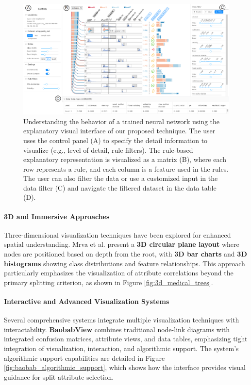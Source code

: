 \begin{figure}[!htb]
    \centering
    \includegraphics[width=\linewidth]{images/rulematrix2.png}
    \caption{ Understanding the behavior of a trained neural network using the explanatory visual interface of our proposed technique. The
user uses the control panel (A) to specify the detail information to visualize (e.g., level of detail, rule filters). The rule-based explanatory
representation is visualized as a matrix (B), where each row represents a rule, and each column is a feature used in the rules. The
user can also filter the data or use a customized input in the data filter (C) and navigate the filtered dataset in the data table (D).}
    \label{fig:rulematrix_interface}
\end{figure}

\paragraph{3D and Immersive Approaches}

Three-dimensional visualization techniques have been explored for enhanced spatial understanding. Mrva et al. \cite{mrva2019decision} present a \textbf{3D circular plane layout} where nodes are positioned based on depth from the root, with \textbf{3D bar charts} and \textbf{3D histograms} showing class distributions and feature relationships. This approach particularly emphasizes the visualization of attribute correlations beyond the primary splitting criterion, as shown in Figure \ref{fig:3d_medical_trees}.

\paragraph{Interactive and Advanced Visualization Systems}

Several comprehensive systems integrate multiple visualization techniques with interactability. \textbf{BaobabView} \cite{elzen2011baobabview} combines traditional node-link diagrams with integrated confusion matrices, attribute views, and data tables, emphasizing tight integration of visualization, interaction, and algorithmic support. The system's algorithmic support capabilities are detailed in Figure \ref{fig:baobab_algorithmic_support}, which shows how the interface provides visual guidance for split attribute selection.

